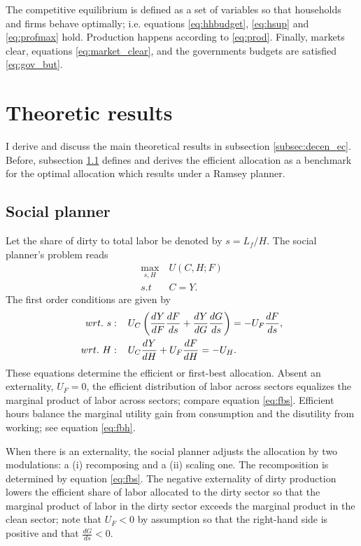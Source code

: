 The competitive equilibrium is defined as a set of variables so that households and firms behave optimally; i.e. equations \ref{eq:hhbudget}, \ref{eq:hsup} and \ref{eq:profmax} hold. Production happens according to \ref{eq:prod}. Finally, markets clear, equations \ref{eq:market_clear}, and the governments budgets are satisfied \ref{eq:gov_but}.

\section{Theoretic results}
 I derive and discuss the main theoretical results in subsection \ref{subsec:decen_ec}. Before, subsection \ref{subsec:sp} defines and derives the efficient allocation as a benchmark for the optimal allocation which results under a Ramsey planner. 

\subsection{Social planner}\label{subsec:sp}
Let the share of dirty to total labor be denoted by $s=L_f/H$. The social planner's problem reads
\begin{align}
\underset{s, H}{\max}\ & U(C,H; F)\\ s.t\ \ & C=Y.
\end{align}
The first order conditions are given by
\begin{align}
wrt.\ s:\hspace{4mm} & U_C\left(\frac{dY}{dF}\frac{dF}{ds}+\frac{dY}{dG}\frac{dG}{ds}\right)=-U_F\frac{dF}{ds}, \label{eq:fbs}
\\
wrt.\ H:\hspace{4mm} & U_C\frac{dY}{dH}+U_F\frac{dF}{dH}=-U_H\label{eq:fbh}. 
\end{align}
These equations determine the efficient or first-best allocation. 
Absent an externality, $U_F=0$, the efficient distribution of labor across sectors equalizes the marginal product of labor across sectors; compare equation \ref{eq:fbs}. Efficient hours balance the marginal utility gain from consumption and the disutility from working; see equation \ref{eq:fbh}. 

When there is an externality, the social planner adjusts the allocation by two modulations: a (i) recomposing and a (ii) scaling one. 
The recomposition is determined by equation \ref{eq:fbs}.
The negative externality of dirty production  lowers the efficient share of labor allocated to  the dirty sector so that the marginal product of labor in the dirty sector exceeds the marginal product in the clean sector; note that $U_F<0$ by assumption so that the right-hand side is positive and that $\frac{dG}{ds}<0$.
\begin{comment}
The equation 
\begin{align}
\frac{-U_F}{U_C \frac{dY}{dF}}=1+\frac{\frac{dY}{dG}\frac{dG}{ds}}{\frac{dY}{dF}\frac{dF}{ds}}.
\end{align}
The term on the left-hand side is the social cost of the externality: it measures what the representative household is willing to pay for a further reduction in dirty production. 
\end{comment}

